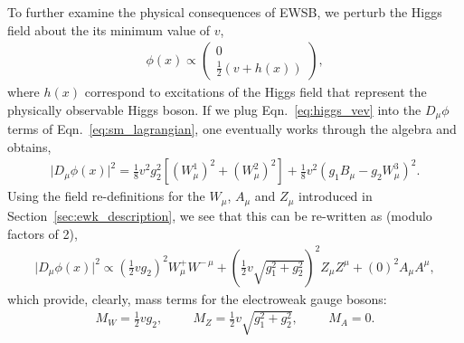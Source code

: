 To further examine the physical consequences of EWSB,
we perturb the Higgs field about the its minimum value of $v$,
\begin{align}
	\phi(x) \propto \left( \begin{matrix} 0 \\ \frac{1}{2}(v + h(x)) \end{matrix} \right),
	\label{eq:higgs_perturb}
\end{align}
where $h(x)$ correspond to excitations of the Higgs field that represent the physically observable
Higgs boson. If we plug Eqn.~\ref{eq:higgs_vev} into the $\mathit{D}_{\mu}\phi$ terms
of Eqn.~\ref{eq:sm_lagrangian}, one eventually works through the algebra and obtains,
\begin{align}
	\lvert\mathit{D}_{\mu} \phi(x)\rvert^2 = \frac{1}{8} v^2 g_2^2 \left[ \left( W^1_{\mu} \right)^2 +\left( W^2_{\mu} \right)^2 \right] 
		+ \frac{1}{8} v^2 \left( g_1 B_{\mu} - g_2 W_{\mu}^3 \right)^2.
	\label{eq:higgs_gauge_expand} 
\end{align}
{\color{red}{mention gauge-boson-higgs interactions / diagrams?}}
Using the field re-definitions for the $W_{\mu}$, $A_{\mu}$ and $Z_{\mu}$ introduced in Section~\ref{sec:ewk_description}, we see that this can be re-written as (modulo factors of 2),
\begin{align}
	\lvert\mathit{D}_{\mu} \phi(x)\rvert^2 \propto \left(\frac{1}{2} v g_2 \right)^2 W_{\mu}^+ W^{-\,\mu} + \left( \frac{1}{2}v \sqrt{g_1^2 + g_2^2} \right)^2 Z_{\mu} Z^{\mu} + (0)^2 A_{\mu} A^{\mu},
	\label{eq:higgs_gauge_masses}
\end{align}
which provide, clearly, mass terms for the electroweak gauge bosons:
\begin{align}
	M_W = \frac{1}{2}v g_2, \hspace{1cm} M_Z = \frac{1}{2}v\sqrt{g_1^2 + g_2^2}, \hspace{1cm} M_A = 0.
	\label{eq:gauge_boson_masses}
\end{align}

